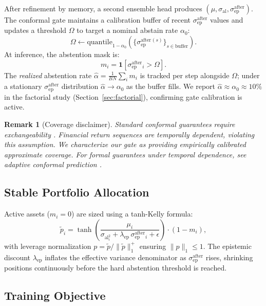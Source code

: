 \documentclass[11pt,a4paper]{article}
\newtheorem{remark}{Remark}
\newcommand{\sal}{\sigma_{\mathrm{al}}}
\newcommand{\sepa}{\sigma_{\mathrm{ep}}^{\mathrm{after}}}
\begin{document}
After refinement by memory, a second ensemble head produces $(\mu, \sal, \sepa)$.
The conformal gate maintains a calibration buffer of recent $\sepa$ values and
updates a threshold $\Omega$ to target a nominal abstain rate $\alpha_0$:
\begin{equation}
  \Omega \gets \mathrm{quantile}_{1 - \alpha_0}(\{\sepa^{(s)}\}_{s \in \text{buffer}}).
\end{equation}
At inference, the abstention mask is:
\begin{equation}
  m_i = \mathbf{1}[\sepa_i > \Omega].
\end{equation}
The \emph{realized} abstention rate $\hat{\alpha} = \frac{1}{BN}\sum_i m_i$
is tracked per step alongside $\Omega$; under a stationary $\sepa$ distribution
$\hat{\alpha} \to \alpha_0$ as the buffer fills.  We report $\hat{\alpha} \approx
\alpha_0 \approx 10\%$ in the factorial study (Section~\ref{sec:factorial}),
confirming gate calibration is active.

\begin{remark}[Coverage disclaimer]
Standard conformal guarantees require exchangeability \citep{vovk2005algorithmic}.
Financial return sequences are temporally dependent, violating this assumption.
We characterize our gate as providing \emph{empirically calibrated approximate
coverage}.  For formal guarantees under temporal dependence, see adaptive
conformal prediction \citep{gibbs2021adaptive}.
\end{remark}

\subsection{Stable Portfolio Allocation}
\label{sec:allocation}

Active assets ($m_i = 0$) are sized using a tanh-Kelly formula:
\begin{equation}
  \tilde{p}_i = \tanh\!\left(
    \frac{\mu_i}{\sal_i^2 + \lambda_{\mathrm{ep}}\,\sepa_i + \epsilon}
  \right) \cdot (1 - m_i),
\end{equation}
with leverage normalization $p = \tilde{p} / \|\tilde{p}\|_1^+$ ensuring
$\|p\|_1 \le 1$.  The epistemic discount $\lambda_{\mathrm{ep}}$ inflates the
effective variance denominator as $\sepa$ rises, shrinking positions
continuously before the hard abstention threshold is reached.

\subsection{Training Objective}
\label{sec:loss}
\end{document}

